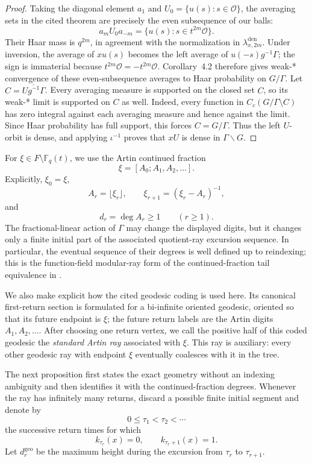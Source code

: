 \documentclass[11pt]{amsart}
\theoremstyle{definition}
\theoremstyle{plain}
\newcommand{\Fq}{\mathbb F_q}
\newcommand{\cO}{\mathcal O}
\begin{document}
\begin{proof}
Taking the diagonal element \(a_1\) and
\(U_0=\{u(s):s\in\cO\}\), the averaging sets in the cited theorem are
precisely the even subsequence of our balls:
\[
a_mU_0a_{-m}
 =\{u(s):s\in t^{2m}\cO\}.
\]
Their Haar mass is \(q^{2m}\), in agreement with the normalization in
\(\lambda_{x,2m}^{\mathrm{den}}\).
Under inversion, the average of \(xu(s)\) becomes the left average of
\(u(-s)g^{-1}\Gamma\); the sign is immaterial because
\(t^{2m}\cO=-t^{2m}\cO\).  Corollary~4.2 therefore gives weak-* convergence
of these even-subsequence averages to Haar probability on \(G/\Gamma\).
Let \(C=\overline{Ug^{-1}\Gamma}\).  Every averaging measure is supported on
the closed set \(C\), so its weak-* limit is supported on \(C\) as well.
Indeed, every function in \(C_c(G/\Gamma\setminus C)\) has zero integral
against each averaging measure and hence against the limit.
Since Haar probability has full support, this forces \(C=G/\Gamma\).  Thus the
left \(U\)-orbit is dense, and applying \(\iota^{-1}\) proves that \(xU\) is
dense in \(\Gamma\backslash G\).
\end{proof}

For \(\xi\in F\setminus\Fq(t)\), we use the Artin continued fraction
\[
\xi=[A_0;A_1,A_2,\ldots].
\]
Explicitly, \(\xi_0=\xi\),
\[
A_r=\lfloor\xi_r\rfloor,\qquad
\xi_{r+1}=(\xi_r-A_r)^{-1},
\]
and
\[
d_r=\deg A_r\ge1\qquad(r\ge1).
\]
The fractional-linear action of \(\Gamma\) may change the displayed digits,
but it changes only a finite initial part of the associated quotient-ray
excursion sequence.  In particular, the eventual sequence of their degrees is
well defined up to reindexing; this is the function-field modular-ray form of
the continued-fraction tail equivalence in
\cite[Theorem~3.2 and Proposition~3.5]{BroisePaulin2007}.

We also make explicit how the cited geodesic coding is used here.  Its
canonical first-return section is formulated for a bi-infinite oriented
geodesic, oriented so that its future endpoint is \(\xi\); the future return labels are the
Artin digits \(A_1,A_2,\ldots\).  After choosing one return vertex, we call the
positive half of this coded geodesic the \emph{standard Artin ray} associated
with \(\xi\).  This ray is auxiliary: every other geodesic ray with endpoint
\(\xi\) eventually coalesces with it in the tree.

The next proposition first states the exact geometry without an indexing
ambiguity and then identifies it with the continued-fraction degrees.  Whenever
the ray has infinitely many returns, discard a possible finite initial segment
and denote by
\[
0\le\tau_1<\tau_2<\cdots
\]
the successive return times for which
\[
k_{\tau_r}(x)=0,\qquad k_{\tau_r+1}(x)=1.
\]
Let \(d_r^{\mathrm{geo}}\) be the maximum height during the excursion from
\(\tau_r\) to \(\tau_{r+1}\).
\end{document}
